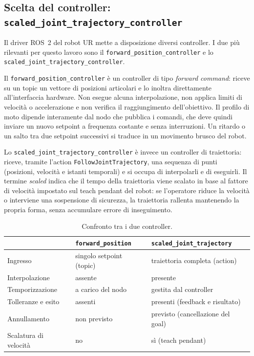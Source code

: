 \subsection{Scelta del controller: \texttt{scaled\_joint\_trajectory\_controller}}

Il driver ROS~2 del robot UR mette a disposizione diversi controller. I due più rilevanti per questo lavoro sono il \texttt{forward\_position\_controller} e lo \texttt{scaled\_joint\_trajectory\_controller}.

Il \texttt{forward\_position\_controller} è un controller di tipo \emph{forward command}: riceve su un topic un vettore di posizioni articolari e lo inoltra direttamente all'interfaccia hardware.
Non esegue alcuna interpolazione, non applica limiti di velocità o accelerazione e non verifica il raggiungimento dell'obiettivo.
Il profilo di moto dipende interamente dal nodo che pubblica i comandi, che deve quindi inviare un nuovo setpoint a frequenza costante e senza interruzioni.
Un ritardo o un salto tra due setpoint successivi si traduce in un movimento brusco del robot.

Lo \texttt{scaled\_joint\_trajectory\_controller} è invece un controller di traiettoria: riceve, tramite l'action \texttt{FollowJointTrajectory},
una sequenza di punti (posizioni, velocità e istanti temporali) e si occupa di interpolarli e di eseguirli. Il termine \emph{scaled} indica che il tempo della traiettoria viene scalato in base al fattore di velocità
impostato sul teach pendant del robot: se l'operatore riduce la velocità o interviene una sospensione di sicurezza, la traiettoria rallenta
mantenendo la propria forma, senza accumulare errore di inseguimento.

\begin{table}[h]
    \centering
    \begin{tabular}{p{4cm}p{4.5cm}p{4.5cm}}
        \toprule
                              & \texttt{forward\_position} & \texttt{scaled\_joint\_trajectory} \\
        \midrule
        Ingresso              & singolo setpoint (topic)   & traiettoria completa (action)      \\
        Interpolazione        & assente                    & presente                           \\
        Temporizzazione       & a carico del nodo          & gestita dal controller             \\
        Tolleranze e esito    & assenti                    & presenti (feedback e risultato)    \\
        Annullamento          & non previsto               & previsto (cancellazione del goal)  \\
        Scalatura di velocità & no                         & sì (teach pendant)                 \\
        \bottomrule
    \end{tabular}
    \caption{Confronto tra i due controller.}
\end{table}

